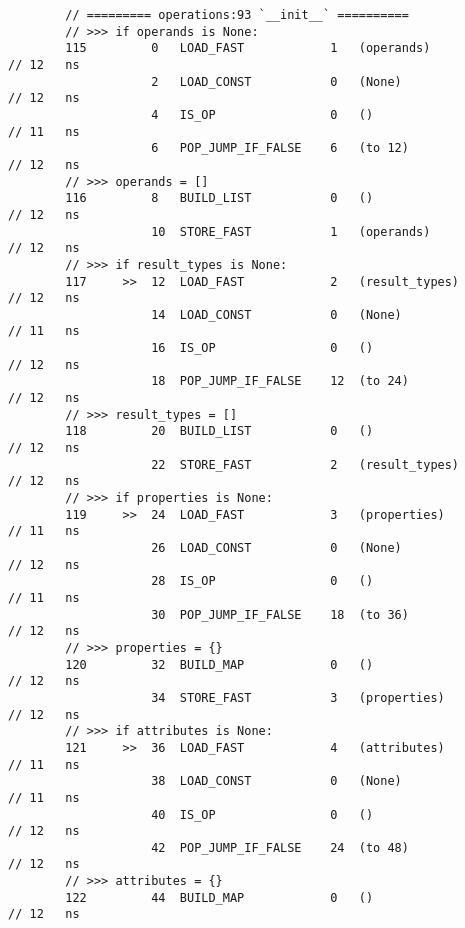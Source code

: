 \begin{code}
\begin{verbatim}
        // ========= operations:93 `__init__` ==========
        // >>> if operands is None:
        115         0   LOAD_FAST            1   (operands)                                 // 12   ns
                    2   LOAD_CONST           0   (None)                                     // 12   ns
                    4   IS_OP                0   ()                                         // 11   ns
                    6   POP_JUMP_IF_FALSE    6   (to 12)                                    // 12   ns
        // >>> operands = []
        116         8   BUILD_LIST           0   ()                                         // 12   ns
                    10  STORE_FAST           1   (operands)                                 // 12   ns
        // >>> if result_types is None:
        117     >>  12  LOAD_FAST            2   (result_types)                             // 12   ns
                    14  LOAD_CONST           0   (None)                                     // 11   ns
                    16  IS_OP                0   ()                                         // 12   ns
                    18  POP_JUMP_IF_FALSE    12  (to 24)                                    // 12   ns
        // >>> result_types = []
        118         20  BUILD_LIST           0   ()                                         // 12   ns
                    22  STORE_FAST           2   (result_types)                             // 12   ns
        // >>> if properties is None:
        119     >>  24  LOAD_FAST            3   (properties)                               // 11   ns
                    26  LOAD_CONST           0   (None)                                     // 12   ns
                    28  IS_OP                0   ()                                         // 11   ns
                    30  POP_JUMP_IF_FALSE    18  (to 36)                                    // 12   ns
        // >>> properties = {}
        120         32  BUILD_MAP            0   ()                                         // 12   ns
                    34  STORE_FAST           3   (properties)                               // 12   ns
        // >>> if attributes is None:
        121     >>  36  LOAD_FAST            4   (attributes)                               // 11   ns
                    38  LOAD_CONST           0   (None)                                     // 11   ns
                    40  IS_OP                0   ()                                         // 12   ns
                    42  POP_JUMP_IF_FALSE    24  (to 48)                                    // 12   ns
        // >>> attributes = {}
        122         44  BUILD_MAP            0   ()                                         // 12   ns

\end{verbatim}
\end{code}

